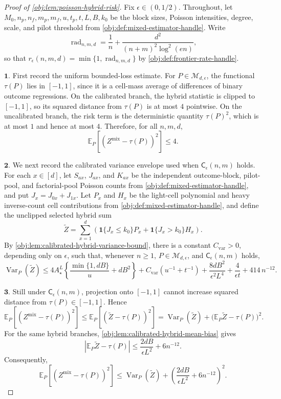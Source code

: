 \documentclass[11pt]{article}
\begin{document}
\begin{proof}[Proof of \cref{obj:lem:poisson-hybrid-risk}]
Fix \(\epsilon\in(0,1/2)\).  Throughout, let \(M_0,n_p,n_f,m_p,m_f,u,t_p,t,L,B,k_0\) be the block sizes, Poisson intensities, degree, scale, and pilot threshold from \cref{obj:def:mixed-estimator-handle}.  Write
\[
\operatorname{rad}_{n,m,d}
=
\frac1n+\frac{d^2}{(n+m)^2\log^2(en)} ,
\]
so that \(r_\epsilon(n,m,d)=\min\{1,\operatorname{rad}_{n,m,d}\}\) by \cref{obj:def:frontier-rate-handle}.

\(\mathbf{1.}\) First record the uniform bounded-loss estimate.  For \(P\in\mathcal M_{d,\epsilon}\), the functional \(\tau(P)\) lies in \([-1,1]\), since it is a cell-mass average of differences of binary outcome regressions.  On the calibrated branch, the hybrid statistic is clipped to \([-1,1]\), so its squared distance from \(\tau(P)\) is at most \(4\) pointwise.  On the uncalibrated branch, the risk term is the deterministic quantity \(\tau(P)^2\), which is at most \(1\) and hence at most \(4\).  Therefore, for all \(n,m,d\),
\[
\mathbb E_P\!\left[(Z^{\mathrm{mix}}-\tau(P))^2\right]\le 4 .
\]

\(\mathbf{2.}\) We next record the calibrated variance envelope used when \(\mathsf C_\epsilon(n,m)\) holds.  For each \(x\in[d]\), let \(S_{ax}\), \(J_{ax}\), and \(K_{ax}\) be the independent outcome-block, pilot-pool, and factorial-pool Poisson counts from \cref{obj:def:mixed-estimator-handle}, and put \(J_x=J_{0x}+J_{1x}\).  Let \(P_x\) and \(H_x\) be the light-cell polynomial and heavy inverse-count cell contributions from \cref{obj:def:mixed-estimator-handle}, and define the unclipped selected hybrid sum
\[
\widetilde Z
=
\sum_{x=1}^d
\left(
\mathbf 1\{J_x\le k_0\}P_x
+
\mathbf 1\{J_x>k_0\}H_x
\right).
\]
By \cref{obj:lem:calibrated-hybrid-variance-bound}, there is a constant \(C_{\mathrm{var}}>0\), depending only on \(\epsilon\), such that, whenever \(n\ge1\), \(P\in\mathcal M_{d,\epsilon}\), and \(\mathsf C_\epsilon(n,m)\) holds,
\[
\operatorname{Var}_P(\widetilde Z)
\le
4A_\star^L
\left\{
\frac{\min\{1,dB\}}u+dB^2
\right\}
+
C_{\mathrm{var}}\left(u^{-1}+t^{-1}\right)
+
\frac{8dB^2}{\epsilon^2L^4}
+
\frac4{\epsilon t}
+
414\,n^{-12}.
\]

\(\mathbf{3.}\) Still under \(\mathsf C_\epsilon(n,m)\), projection onto \([-1,1]\) cannot increase squared distance from \(\tau(P)\in[-1,1]\).  Hence
\[
\mathbb E_P\!\left[(Z^{\mathrm{mix}}-\tau(P))^2\right]
\le
\mathbb E_P\!\left[(\widetilde Z-\tau(P))^2\right]
=
\operatorname{Var}_P(\widetilde Z)
+
\bigl(\mathbb E_P\widetilde Z-\tau(P)\bigr)^2 .
\]
For the same hybrid branches, \cref{obj:lem:calibrated-hybrid-mean-bias} gives
\[
\left|\mathbb E_P\widetilde Z-\tau(P)\right|
\le
\frac{2dB}{\epsilon L^2}+6n^{-12}.
\]
Consequently,
\[
\mathbb E_P\!\left[(Z^{\mathrm{mix}}-\tau(P))^2\right]
\le
\operatorname{Var}_P(\widetilde Z)
+
\left(
\frac{2dB}{\epsilon L^2}+6n^{-12}
\right)^2 .
\]


\end{proof}
\end{document}
